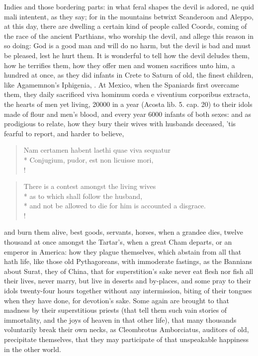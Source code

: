 {Indies and those bordering parts: in what feral shapes the
devil is adored, ne quid mali intentent, as they say; for in the
mountains betwixt Scanderoon and Aleppo, at this day, there are
dwelling a certain kind of people called Coords, coming of the race of
the ancient Parthians, who worship the devil, and allege this reason in
so doing: God is a good man and will do no harm, but the devil is bad
and must be pleased, lest he hurt them. It is wonderful to tell how the
devil deludes them, how he terrifies them, how they offer men and women
sacrifices unto him, a hundred at once, as they did infants in Crete to
Saturn of old, the finest children, like Agamemnon's Iphigenia, \etc{}. At
Mexico, when the Spaniards first overcame them, they daily
sacrificed viva hominum corda e viventium corporibus extracta, the
hearts of men yet living, 20\thinspace{}000 in a year (Acosta lib. 5. cap. 20) to
their idols made of flour and men's blood, and every year 6000 infants
of both sexes: and as prodigious to relate, how they bury their
wives with husbands deceased, 'tis fearful to report, and harder to
believe,

\begin{latin}
\begin{verse}%
Nam certamen habent laethi quae viva sequatur\\*
Conjugium, pudor, est non licuisse mori,\\!
\end{verse}%
\end{latin}
\translationrule%
\begin{verse}%
There is a contest amongst the living wives\\*
as to which shall follow the husband,\\*
and not be allowed to die for him is accounted a disgrace.\\!
\end{verse}%

and burn them alive, best goods, servants, horses, when a grandee dies,
twelve thousand at once amongst the Tartar's, when a great Cham
departs, or an emperor in America: how they plague themselves, which
abstain from all that hath life, like those old Pythagoreans, with
immoderate fastings, as the Bannians about Surat, they of China,
that for superstition's sake never eat flesh nor fish all their lives,
never marry, but live in deserts and by-places, and some pray to their
idols twenty-four hours together without any intermission, biting of
their tongues when they have done, for devotion's sake. Some again are
brought to that madness by their superstitious priests (that tell them
such vain stories of immortality, and the joys of heaven in that other
life),  that many thousands voluntarily break their own necks, as
Cleombrotus Amborciatus, auditors of old, precipitate themselves, that
they may participate of that unspeakable happiness in the other world.

}
